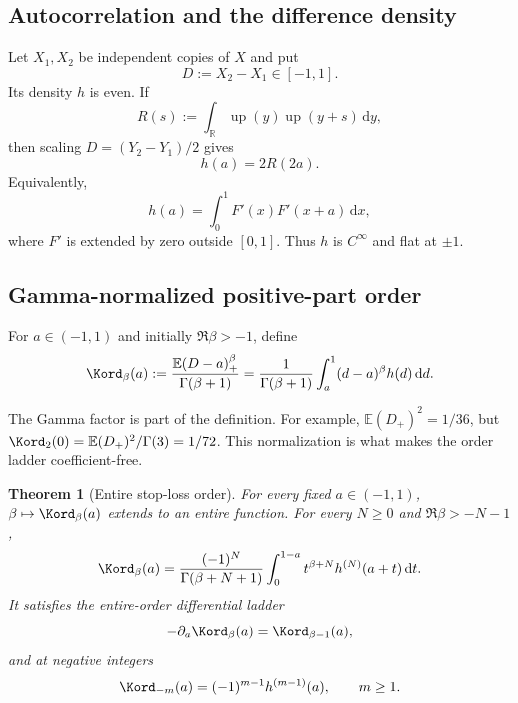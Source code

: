 \documentclass[11pt,oneside]{article}
\newtheorem{theorem}{Theorem}[section]
\theoremstyle{definition}
\theoremstyle{remark}
\newcommand{\Up}{\operatorname{up}}
\newcommand{\E}{\mathbb E}
\newcommand{\R}{\mathbb R}
\newcommand{\dd}{\,\mathrm d}
\newcommand{\1}{\mathbf 1}
\begin{document}
\subsection{Autocorrelation and the difference density}

Let $X_1,X_2$ be independent copies of $X$ and put
\begin{equation}
 D:=X_2-X_1\in[-1,1].
 \label{p11:eq:D-def}
\end{equation}
Its density $h$ is even.  If
\begin{equation}
 R(s):=\int_{\R}\Up(y)\Up(y+s)\dd y,
 \label{p11:eq:up-autocorrelation}
\end{equation}
then scaling $D=(Y_2-Y_1)/2$ gives
\begin{equation}
 h(a)=2R(2a).
 \label{p11:eq:h-R-relation}
\end{equation}
Equivalently,
\begin{equation}
 h(a)=\int_0^1F'(x)F'(x+a)\dd x,
 \label{p11:eq:h-F-density-correlation}
\end{equation}
where $F'$ is extended by zero outside $[0,1]$.  Thus $h$ is $C^\infty$ and
flat at $\pm1$.

\subsection{Gamma-normalized positive-part order}

For $a\in(-1,1)$ and initially $\Re\beta>-1$, define
\begin{equation}
 \Kord_\beta(a)
 :=\frac{\E(D-a)_+^\beta}{\Gamma(\beta+1)}
 =\frac1{\Gamma(\beta+1)}
  \int_a^1(d-a)^\beta h(d)\dd d.
 \label{p11:eq:K-beta-def}
\end{equation}

\begin{warning}
The Gamma factor is part of the definition.  For example,
$\E(D_+)^2=1/36$, but
$\Kord_2(0)=\E(D_+)^2/\Gamma(3)=1/72$.  This normalization is what makes the
order ladder coefficient-free.
\end{warning}

\begin{theorem}[Entire stop-loss order]
\label{p11:thm:K-entire}
For every fixed $a\in(-1,1)$, $\beta\mapsto\Kord_\beta(a)$ extends to an
entire function.  For every $N\ge0$ and $\Re\beta>-N-1$,
\begin{equation}
 \Kord_\beta(a)
 =\frac{(-1)^N}{\Gamma(\beta+N+1)}
  \int_0^{1-a}t^{\beta+N}h^{(N)}(a+t)\dd t.
 \label{p11:eq:K-entire-continuation}
\end{equation}
It satisfies the entire-order differential ladder
\begin{equation}
 -\partial_a\Kord_\beta(a)=\Kord_{\beta-1}(a),
 \label{p11:eq:K-order-ladder}
\end{equation}
and at negative integers
\begin{equation}
 \Kord_{-m}(a)=(-1)^{m-1}h^{(m-1)}(a),
 \qquad m\ge1.
 \label{p11:eq:K-negative-orders}
\end{equation}
\end{theorem}
\end{document}
